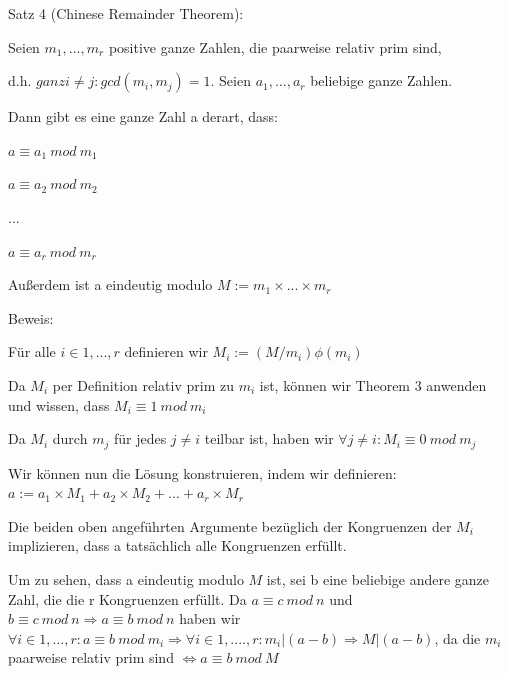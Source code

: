 \documentclass[a4paper]{article}
\begin{document}
\begin{multicols}{3}
\begin{itemize*}
\begin{itemize*}
\begin{itemize*}
                  \end{itemize*}
            \end{itemize*}
            \item Satz 4 (Chinese Remainder Theorem):
            \begin{itemize*}
                  \item Seien $m_1,...,m_r$ positive ganze Zahlen, die paarweise relativ prim sind,
                  \item d.h. $ganz i\not= j:gcd(m_i, m_j) = 1$. Seien $a_1,...,a_r$ beliebige ganze Zahlen.
                  \item Dann gibt es eine ganze Zahl a derart, dass:
                  \begin{itemize*}
                        \item $a\equiv a_1\ mod\ m_1$
                        \item $a\equiv a_2\ mod\ m_2$
                        \item ...
                        \item $a\equiv a_r\ mod\ m_r$
                  \end{itemize*}
                  \item Außerdem ist a eindeutig modulo $M := m_1\times ...\times m_r$
                  \item Beweis:
                  \begin{itemize*}
                        \item Für alle $i\in{1,...,r}$ definieren wir $M_i:=(M/m_i)\phi(m_i)$
                        \item Da $M_i$ per Definition relativ prim zu $m_i$ ist, können wir Theorem 3 anwenden und wissen, dass $M_i\equiv 1\ mod\ m_i$
                        \item Da $M_i$ durch $m_j$ für jedes $j\not= i$ teilbar ist, haben wir $\forall j\not= i:M_i\equiv 0\ mod\ m_j$ \item Wir können nun die Lösung konstruieren, indem wir definieren: $a:= a_1\times M_1+a_2\times M_2+...+a_r\times M_r$
                        \item Die beiden oben angeführten Argumente bezüglich der Kongruenzen der $M_i$ implizieren, dass a tatsächlich alle Kongruenzen erfüllt.
                        \item Um zu sehen, dass a eindeutig modulo $M$ ist, sei b eine beliebige andere ganze Zahl, die die r Kongruenzen erfüllt. Da $a\equiv c\ mod\ n$ und $b\equiv c\ mod\ n \Rightarrow a \equiv b\ mod\ n$ haben wir $\forall i\in{1,...,r}:a\equiv b\ mod\ m_i\Rightarrow\forall i\in{1,. ...,r}:m_i|(a-b) \Rightarrow M|(a-b)$, da die $m_i$ paarweise relativ prim sind $\Leftrightarrow a\equiv b\ mod\ M$

\end{itemize*}
\end{itemize*}
\end{itemize*}
\end{multicols}
\end{document}

